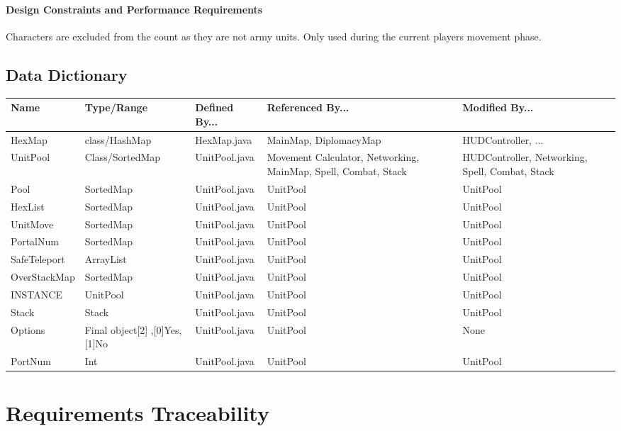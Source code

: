 \documentclass[12pt,a4paper,titlepage]{article}
\begin{document}
\paragraph{Design Constraints and Performance Requirements} Characters are excluded from the count as they are not army units.  Only used during the current players movement phase.  

\subsection{Data Dictionary}
\small{
\begin{center}
\keepXColumns
\noindent\begin{tabularx}{\linewidth}{|l|X|X|X|X|}\hline
\textbf{Name} & \textbf{Type/Range} & \textbf{Defined By...} & \textbf{Referenced By...} & \textbf{Modified By...}\\
\hline
HexMap & class/HashMap & HexMap.java & MainMap, DiplomacyMap & HUDController, ...\\
\hline
UnitPool & Class/SortedMap & UnitPool.java & Movement Calculator, Networking, MainMap, Spell, Combat, Stack & HUDController, Networking, Spell, Combat, Stack\\
\hline
Pool & SortedMap & UnitPool.java & UnitPool & UnitPool\\
\hline
HexList & SortedMap & UnitPool.java & UnitPool & UnitPool\\
\hline
UnitMove & SortedMap & UnitPool.java & UnitPool & UnitPool\\
\hline
PortalNum & SortedMap & UnitPool.java & UnitPool & UnitPool\\
\hline
SafeTeleport & ArrayList & UnitPool.java & UnitPool & UnitPool\\
\hline
OverStackMap & SortedMap & UnitPool.java & UnitPool & UnitPool\\
\hline
INSTANCE & UnitPool & UnitPool.java & UnitPool & UnitPool\\
\hline
Stack & Stack & UnitPool.java & UnitPool & UnitPool\\
\hline
Options & Final object[2] ,[0]Yes, [1]No & UnitPool.java & UnitPool & None\\
\hline
PortNum & Int & UnitPool.java & UnitPool & UnitPool\\
\hline
\end{tabularx}
\end{center}
}
	
\section{Requirements Traceability}
\end{document}
